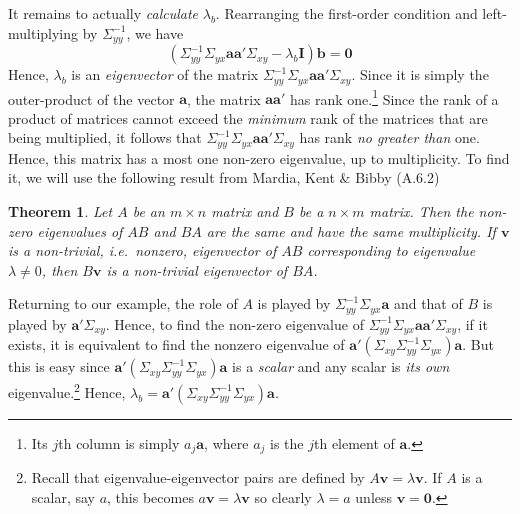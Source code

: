 \documentclass[12pt]{article}
\newtheorem{thm}{Theorem}[section]
\theoremstyle{definition}
\begin{document}
It remains to actually \emph{calculate} $\lambda_b$. Rearranging the first-order condition and left-multiplying by $\Sigma_{yy}^{-1}$, we have
  $$\left(\Sigma_{yy}^{-1}\Sigma_{yx} \textbf{a}\textbf{a}' \Sigma_{xy} - \lambda_b \textbf{I}\right)\textbf{b} = \textbf{0}$$
Hence, $\lambda_b$ is an \emph{eigenvector} of the matrix $\Sigma_{yy}^{-1}\Sigma_{yx} \textbf{a}\textbf{a}' \Sigma_{xy}$. 
Since it is simply the outer-product of the vector $\mathbf{a}$, the matrix $\mathbf{a}\mathbf{a}'$ has rank one.\footnote{Its $j$th column is simply $a_j \mathbf{a}$, where $a_j$ is the $j$th element of $\mathbf{a}$.} 
Since the rank of a product of matrices cannot exceed the \emph{minimum} rank of the matrices that are being multiplied, it follows that $\Sigma_{yy}^{-1}\Sigma_{yx} \textbf{a}\textbf{a}' \Sigma_{xy}$ has rank \emph{no greater than} one. 
Hence, this matrix has a most one non-zero eigenvalue, up to multiplicity. To find it, we will use the following result from Mardia, Kent \& Bibby (A.6.2)
\begin{thm}
  Let $A$ be an $m\times n$ matrix and $B$ be a $n \times m$ matrix. Then the non-zero eigenvalues of $AB$ and $BA$ are the same and have the same multiplicity. If $\mathbf{v}$ is a non-trivial, i.e.\ nonzero, eigenvector of $AB$ corresponding to eigenvalue $\lambda \neq 0$, then $B \mathbf{v}$ is a non-trivial eigenvector of $BA$.
\end{thm}
Returning to our example, the role of $A$ is played by $\Sigma_{yy}^{-1}\Sigma_{yx}\mathbf{a}$ and that of $B$ is played by $\mathbf{a}'\Sigma_{xy}$. Hence, to find the non-zero eigenvalue of $\Sigma_{yy}^{-1}\Sigma_{yx} \textbf{a}\textbf{a}' \Sigma_{xy}$, if it exists, it is equivalent to find the nonzero eigenvalue of $\mathbf{a}'(\Sigma_{xy}\Sigma_{yy}^{-1}\Sigma_{yx})\mathbf{a}$. But this is easy since $\mathbf{a}'(\Sigma_{xy}\Sigma_{yy}^{-1}\Sigma_{yx})\mathbf{a}$ is a \emph{scalar} and any scalar is \emph{its own} eigenvalue.\footnote{Recall that eigenvalue-eigenvector pairs are defined by $A \mathbf{v} = \lambda \mathbf{v}$. If $A$ is a scalar, say $a$, this becomes $a \mathbf{v} = \lambda \mathbf{v}$ so clearly $\lambda = a$ unless $\mathbf{v}=\mathbf{0}$.} Hence, $\lambda_b = \mathbf{a}'(\Sigma_{xy}\Sigma_{yy}^{-1}\Sigma_{yx})\mathbf{a}$.
\end{document}
